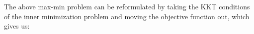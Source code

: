 The above max-min problem can be reformulated by taking the KKT conditions of the inner minimization problem and moving the objective function out, which gives us:


